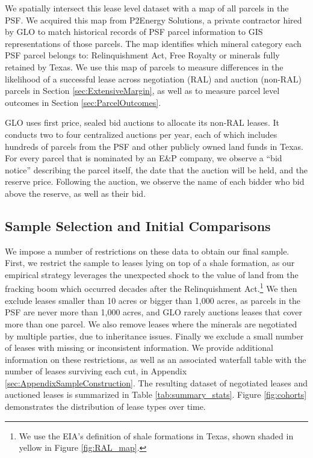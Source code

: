 \documentclass[12pt]{article}
\newcommand{\inputy}[1]{\unskip}
\begin{document}
We spatially intersect this lease level dataset with a map of all parcels in the PSF.  We acquired this map from P2Energy Solutions, a private contractor hired by GLO to match historical records of PSF parcel information to GIS representations of those parcels.  The map identifies which mineral category each PSF parcel belongs to: Relinquishment Act, Free Royalty or minerals fully retained by Texas.  We use this map of parcels to measure differences in the likelihood of a successful lease across negotiation (RAL) and auction (non-RAL) parcels in Section \ref{sec:ExtensiveMargin}, as well as to measure parcel level outcomes in Section \ref{sec:ParcelOutcomes}. 

GLO uses first price, sealed bid auctions to allocate its non-RAL leases. It conducts two to four centralized auctions per year, each of which includes hundreds of parcels from the PSF and other publicly owned land funds in Texas. For every parcel that is nominated by an E\&P company, we observe a ``bid notice'' describing the parcel itself, the date that the auction will be held, and the reserve price.  Following the auction, we observe the name of each bidder who bid above the reserve, as well as their bid.  

\subsection{Sample Selection and Initial Comparisons}\label{sec:sampleSelection}
We impose a number of restrictions on these data to obtain our final sample. First, we restrict the sample to leases lying on top of a shale formation, as our empirical strategy leverages the unexpected shock to the value of land from the fracking boom which occurred decades after the Relinquishment Act.\footnote{We use the EIA's definition of shale formations in Texas, shown shaded in yellow in Figure \ref{fig:RAL_map}.} We then exclude leases smaller than 10 acres or bigger than 1,000 acres, as parcels in the PSF are never more than 1,000 acres, and GLO rarely auctions leases that cover more than one parcel. We also remove leases where the minerals are negotiated by multiple parties, due to inheritance issues. Finally we exclude a small number of leases with missing or inconsistent information. We provide additional information on these restrictions, as well as an associated waterfall table with the number of leases surviving each cut, in Appendix \ref{sec:AppendixSampleConstruction}. The resulting dataset of \inputy{../output/estimates/Nsample_NEGOTIATION_CLEAN.tex} negotiated leases and \inputy{../output/estimates/Nsample_AUCTION_CLEAN.tex} auctioned leases is summarized in Table \ref{tab:summary_stats}. Figure \ref{fig:cohorts} demonstrates the distribution of lease types over time.  
\end{document}
